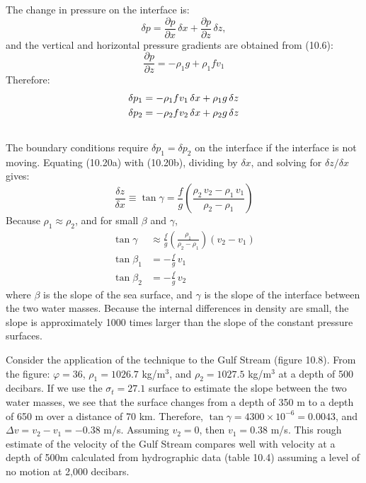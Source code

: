 The change in pressure on the interface is:
\begin{equation}
\delta p = \frac{\partial p}{\partial x}\,\delta x + \frac{\partial p}{\partial
z}\, \delta z ,
\end{equation}
and the vertical and horizontal pressure gradients are obtained from (10.6):
\begin{equation}
\frac{\partial p}{\partial z}= - \rho_1 g + \rho_1 f v_1
\end{equation}
Therefore:
\begin{subequations}
\begin{align}
\delta p_1&=-\rho_1fv_1 \, \delta x + \rho_1 g \, \delta z \\
\delta p_2&=-\rho_2fv_2 \, \delta x + \rho_2 g \, \delta z \\ \notag
\end{align}
\end {subequations}
The boundary conditions require $\delta p_1 = \delta p_2$ on the interface if the interface is
not moving. Equating (10.20a) with (10.20b), dividing by $\delta x$, and solving for $\delta
z/\delta x$ gives:
\begin{displaymath}
\frac{\delta z}{\delta x}\equiv \tan \gamma =\frac{f}{g}\left(\frac{\rho_2\,v_2
- \rho_1\,v_1}{\rho_2 -\rho_1}\right)
\end{displaymath}
Because $\rho_1 \approx \rho_2$, and for small $\beta$ and $\gamma$,
\begin{subequations}
\begin{align}
\tan \gamma &\approx \frac{f}{g}\left(\frac{\rho_1}{\rho_2 - \rho_1}\right)(v_2-v_1) \\
\tan \beta_1&=-\frac{f}{g}\, v_1 \\
\tan \beta_2&=-\frac{f}{g}\, v_2
\end{align}
\end {subequations}
where $\beta$ is the slope of the sea surface, and $\gamma$ is the slope of the
interface between the two water masses. Because the internal differences in density are
small, the slope is approximately 1000 times larger than the slope of the constant
pressure surfaces.

Consider the application of the technique to the Gulf Stream (figure
10.8). From the figure: $\varphi = 36$\degrees, $\rho_1 = 1026.7$ kg/m$^3$, and
$\rho_2 = 1027.5$ kg/m$^3$ at a depth of 500 decibars. If we use the $\sigma_t =
27.1$ surface to estimate the slope between the two water masses, we see that the
surface changes from a depth of 350 m to a depth of 650 m over a distance of 70
km. Therefore,
$\tan
\gamma = 4300 \times 10^{-6} = 0.0043$, and
$\Delta v = v_2 - v_1 = -0.38$ m/s. Assuming $v_2 = 0$, then $v_1 = 0.38$ m/s.
This rough estimate of the velocity of the Gulf Stream compares
well with velocity at a depth of 500m calculated from hydrographic data (table 10.4) assuming a level of no motion at 2,000 decibars.

